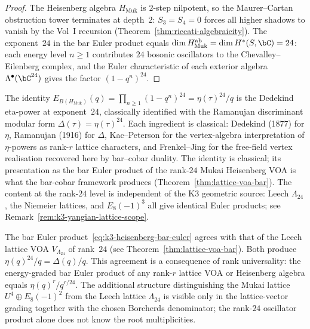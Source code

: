 \begin{proof}
The Heisenberg algebra $H_{\mathrm{Muk}}$ is $2$-step nilpotent,
so the Maurer--Cartan obstruction tower terminates at depth~$2$:
$S_3 = S_4 = 0$ forces all higher shadows to vanish by the
Vol~I recursion
(Theorem~\ref{thm:riccati-algebraicity}).
The exponent~$24$ in the bar Euler product equals
$\dim H_{\mathrm{Muk}}^{\mathrm{ab}} = \dim H^*(S, \bC) = 24$:
each energy level $n \geq 1$ contributes $24$ bosonic oscillators
to the Chevalley--Eilenberg complex, and the Euler characteristic
of each exterior algebra $\Lambda^{\bullet}(\bC^{24})$ gives
the factor $(1 - q^n)^{24}$.
\end{proof}

\begin{remark}
\label{rem:k3-heisenberg-bar-classical}
The identity
$E_{B(H_{\mathrm{Muk}})}(q) = \prod_{n \geq 1}(1-q^n)^{24} = \eta(\tau)^{24}/q$
is the Dedekind eta-power at exponent~$24$, classically identified with
the Ramanujan discriminant modular form $\Delta(\tau) = \eta(\tau)^{24}$.
Each ingredient is classical: Dedekind (1877) for $\eta$, Ramanujan
(1916) for $\Delta$, Kac--Peterson \cite{KacPeterson1984} for the
vertex-algebra interpretation of $\eta$-powers as rank-$r$ lattice
characters, and Frenkel--Jing \cite{FrenkelJing1988} for the free-field
vertex realisation recovered here by bar--cobar duality. The identity
is classical; its presentation as the bar Euler product of the
rank-$24$ Mukai Heisenberg VOA is what the bar-cobar framework
produces (Theorem~\ref{thm:lattice-voa-bar}). The content at the rank-$24$ level is
independent of the K3 geometric source: Leech $\Lambda_{24}$, the
Niemeier lattices, and $E_8(-1)^3$ all give identical Euler products;
see Remark~\ref{rem:k3-yangian-lattice-scope}.
\end{remark}

\begin{remark}
\label{rem:k3-heisenberg-leech}
The bar Euler product~\eqref{eq:k3-heisenberg-bar-euler} agrees with
that of the Leech lattice VOA $V_{\Lambda_{24}}$ of rank~$24$
(see Theorem~\ref{thm:lattice-voa-bar}).
Both produce $\eta(q)^{24}/q = \Delta(q)/q$.
This agreement is a consequence of rank universality: the
energy-graded bar Euler product of any rank-$r$ lattice VOA or
Heisenberg algebra equals $\eta(q)^r/q^{r/24}$.
The additional structure distinguishing the Mukai lattice
$U^4 \oplus E_8(-1)^2$ from the Leech lattice $\Lambda_{24}$ is visible
only in the lattice-vector grading together with the chosen Borcherds
denominator; the rank-$24$ oscillator product alone does not know the
root multiplicities.
\end{remark}


